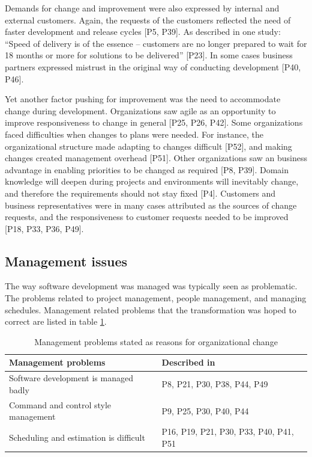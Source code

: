 Demands for change and improvement were also expressed by internal and external
customers. Again, the requests of the customers reflected the need of faster
development and release cycles [P5, P39]. As described in one study: ``Speed of
delivery is of the essence -- customers are no longer prepared to wait for 18
months or more for solutions to be delivered'' [P23]. In some cases business
partners expressed mistrust in the original way of conducting development [P40,
P46].

Yet another factor pushing for improvement was the need to accommodate change
during development. Organizations saw agile as an opportunity to improve
responsiveness to change in general [P25, P26, P42].
Some organizations faced difficulties when changes to plans were needed. For
instance, the organizational structure made adapting to changes difficult [P52],
and making changes created management overhead [P51]. Other organizations saw an
business advantage in enabling priorities to be changed as required [P8, P39].
Domain knowledge will deepen during projects and environments will inevitably
change, and therefore the requirements should not stay fixed [P4].
Customers and business representatives were in many cases attributed as the
sources of change requests, and the responsiveness to customer requests needed
to be improved [P18, P33, P36, P49].

\subsection{Management issues}

The way software development was managed was typically seen as problematic. The
problems related to project management, people management, and managing
schedules. Management related problems that the transformation was hoped to
correct are listed in table \ref{table:reasonstochange_management}.

\begin{table}
    \centering
    \begin{tabular}{ >{\raggedright\arraybackslash}p{}
                     >{\raggedright\arraybackslash}p{} }
        \toprule
        Management problems           &  Described in  \\
        \midrule
        Software development is managed badly   &  P8, P21, P30, P38, P44, P49  \\
        Command and control style management    &  P9, P25, P30, P40, P44  \\
        Scheduling and estimation is difficult  &  P16, P19, P21, P30, P33, P40, P41, P51  \\
        \bottomrule
    \end{tabular}
    \caption{Management problems stated as reasons for organizational change}
    \label{table:reasonstochange_management}
\end{table}

